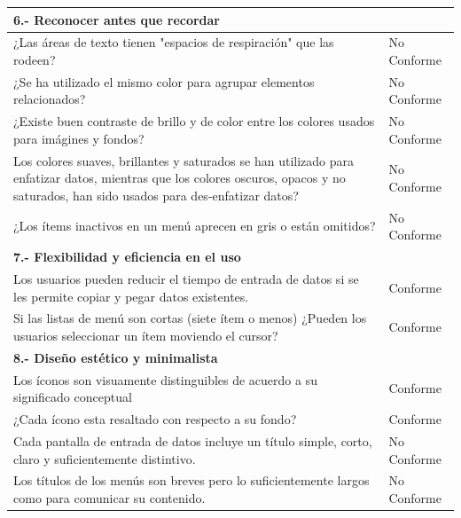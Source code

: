 \documentclass[stu, 12pt, letterpaper, donotrepeattitle, floatsintext, natbib]{apa7}
\begin{document}
\begin{longtable}{|>{\raggedright\arraybackslash}p{10cm}|>{\centering\arraybackslash}p{3cm}|}
    \textbf{6.- Reconocer antes que recordar} & \\ \hline
    ¿Las áreas de texto tienen "espacios de respiración" que las rodeen? & No Conforme \\ \hline
    ¿Se ha utilizado el mismo color para agrupar elementos relacionados? & No Conforme \\ \hline
    ¿Existe buen contraste de brillo y de color entre los colores usados para imágines y fondos? & No Conforme \\ \hline
    Los colores suaves, brillantes y saturados se han utilizado para enfatizar datos, mientras que los colores oscuros, opacos y no saturados, han sido usados para des-enfatizar datos? & No Conforme \\ \hline
    ¿Los ítems inactivos en un menú aprecen en gris o están omitidos? & No Conforme \\ \hline

    \textbf{7.- Flexibilidad y eficiencia en el uso} & \\ \hline
    Los usuarios pueden reducir el tiempo de entrada de datos si se les permite copiar y pegar datos existentes. & Conforme \\ \hline
    Si las listas de menú son cortas (siete ítem o menos) ¿Pueden los usuarios seleccionar un ítem moviendo el cursor? & Conforme \\ \hline

    \textbf{8.- Diseño estético y minimalista} & \\ \hline
    Los íconos son visuamente distinguibles de acuerdo a su significado conceptual  & Conforme \\ \hline
    ¿Cada ícono esta resaltado con respecto a su fondo? & Conforme \\ \hline
    Cada pantalla de entrada de datos incluye un título simple, corto, claro y suficientemente distintivo. & No Conforme \\ \hline
    Los títulos de los menús son breves pero lo suficientemente largos como para comunicar su contenido. & No Conforme \\ \hline


\end{longtable}
\end{document}

